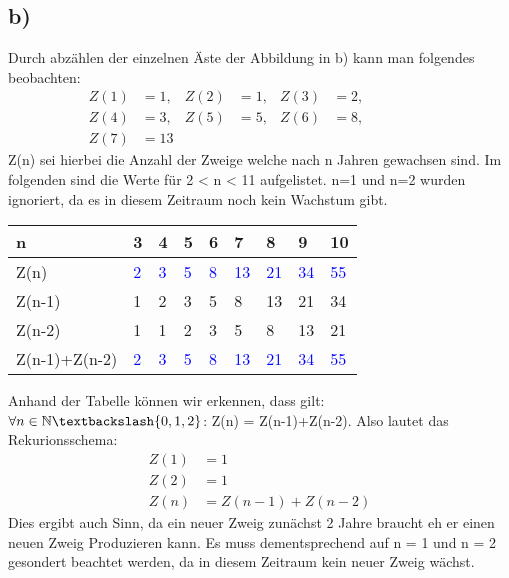 \documentclass[titlepage]{article}
\begin{document}
\subsection*{b)}
		Durch abzählen der einzelnen Äste der Abbildung in b) kann man folgendes beobachten:
		\begin{align*}
			Z(1)&=1, & Z(2)&=1, & Z(3)&=2,&&&&&&\\
			Z(4)&=3, & Z(5)&=5, & Z(6)&=8,\\
			Z(7)&=13
		\end{align*}
		Z(n) sei hierbei die Anzahl der Zweige welche nach n Jahren gewachsen sind. Im folgenden sind die Werte für 2 < n < 11 aufgelistet. n=1 und n=2 wurden ignoriert, da es in diesem Zeitraum noch kein Wachstum gibt.
		\begin{table}[h]
			\centering
			\begin{tabular}{l|llllllll}
				n&3&4&5&6&7&8&9&10\\\hline
				Z(n)&\textcolor{blue}{2}&\textcolor{blue}{3}&\textcolor{blue}{5}&\textcolor{blue}{8}&\textcolor{blue}{13}&\textcolor{blue}{21}&\textcolor{blue}{34}&\textcolor{blue}{55}\\
				Z(n-1) &1&2&3&5&8&13&21&34\\
				Z(n-2) &1&1&2&3&5&8&13&21\\
				Z(n-1)+Z(n-2) &\textcolor{blue}{2}&\textcolor{blue}{3}&\textcolor{blue}{5}&\textcolor{blue}{8}&\textcolor{blue}{13}&\textcolor{blue}{21}&\textcolor{blue}{34}&\textcolor{blue}{55}
			\end{tabular}
		\end{table}
	
	\noindent
	Anhand der Tabelle können wir erkennen, dass gilt: $\forall n\in\mathbb{N}\textbackslash\{0,1,2\}$: Z(n) = Z(n-1)+Z(n-2). Also lautet das Rekurionsschema:
	\begin{align*}
		Z(1)&=1\\
		Z(2)&=1\\
		Z(n)&=Z(n-1)+Z(n-2)
	\end{align*}
	Dies ergibt auch Sinn, da ein neuer Zweig zunächst 2 Jahre braucht eh er einen neuen Zweig Produzieren kann. Es muss dementsprechend auf n = 1 und n = 2 gesondert beachtet werden, da in diesem Zeitraum kein neuer Zweig wächst.
\end{document}
